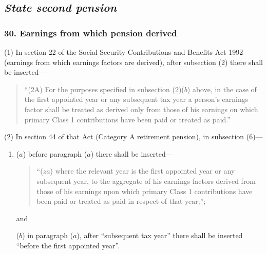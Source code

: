 \documentclass[12pt,a4paper]{article}
\begin{document}
\renewcommand\parthead{--- Part II Chapter I}

\subsection{\itshape State second pension}

\subsubsection{30. Earnings from which pension derived}

(1) In section 22 of the Social Security Contributions and Benefits Act 1992 (earnings from which earnings factors are derived), after subsection (2)  there shall be inserted—
\begin{quotation}
“(2A) For the purposes specified in subsection (2)($b$)  above, in the case of the first appointed year or any subsequent tax year a person’s earnings factor shall be treated as derived only from those of his earnings on which primary Class 1 contributions have been paid or treated as paid.”
\end{quotation}

(2) In section 44 of that Act (Category A retirement pension), in subsection (6)—
\begin{enumerate}\item[]
($a$) before paragraph ($a$)  there shall be inserted—
\begin{quotation}
“($za$) where the relevant year is the first appointed year or any subsequent year, to the aggregate of his earnings factors derived from those of his earnings upon which primary Class 1 contributions have been paid or treated as paid in respect of that year;”;
\end{quotation}
and

($b$) in paragraph ($a$), after “subsequent tax year” there shall be inserted “before the first appointed year”.
\end{enumerate}
\end{document}
